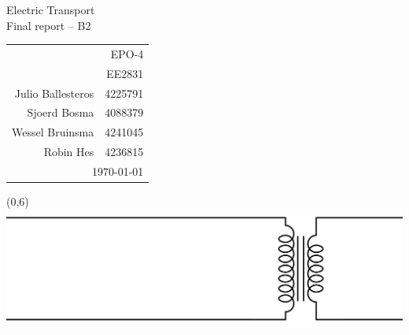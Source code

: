 \documentclass[11pt,titlepage]{report}
\begin{document}
\begin{titlepage}

 \BgThispage

\newlength{\drop}

\begingroup
	\sffamily

	\textheight
	\vspace*{\drop}
	\begin{flushright}
		{\fontsize{1.8cm}{1em} \selectfont \color{white} Electric Transport} \\
		\vspace*{52pt}
		{\fontsize{0.8cm}{1em} \selectfont Final report -- B2}

		\vfill

		{\fontsize{0.5cm}{1em} \selectfont
			\normalfont
			
			\begin{tabular}{rr}
				\multicolumn{2}{r}{EPO-4} \\[0.5em]
				\multicolumn{2}{r}{EE2831} \\[1.5em]
				Julio Ballesteros & 4225791 \\[0.5em]
				Sjoerd Bosma & 4088379 \\[0.5em]
				Wessel Bruinsma & 4241045 \\[0.5em]
				Robin Hes & 4236815 \\[1.5em]
				\multicolumn{2}{r}{\today} \\
			\end{tabular}
			
		}
	\end{flushright}
\endgroup

\begin{textblock}{16.1}(0,6)
	\includegraphics[width=\linewidth]{resource/title.png}
\end{textblock}

\end{titlepage}
\end{document}
